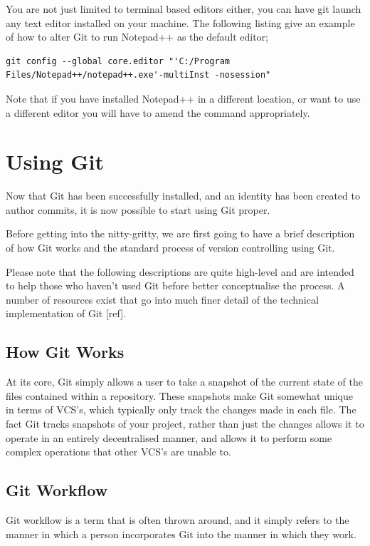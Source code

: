 \documentclass[11pt, a4paper, titlepage]{article}
\begin{document}
You are not just limited to terminal based editors either, you can have git
launch any text editor installed on your machine.
The following listing give an example of how to alter Git to run  Notepad++ as
the default editor;

\begin{lstlisting}[label=lst_config_note,
caption=Updating the defualt Git editor to Notepad++]
 git config --global core.editor "'C:/Program Files/Notepad++/notepad++.exe'-multiInst -nosession" 
\end{lstlisting}

Note that if you have installed Notepad++ in a different location, or want to
use a different editor you will have to amend the command appropriately.



\section{Using Git}
Now that Git has been successfully installed, and an identity has been created
to author commits, it is now possible to start using Git proper.

Before getting into the nitty-gritty, we are first going to have a brief
description of how Git works and the standard process of version controlling
using Git. 

Please note that the following descriptions are quite high-level and are
intended to help those who haven't used Git before better conceptualise the
process. 
A number of resources exist that go into much finer detail of the
technical implementation of Git [ref].

\subsection{How Git Works}
At its core, Git simply allows a user to take a snapshot of the current state
of the files contained within a repository.
These snapshots make Git somewhat unique in terms of VCS's, which typically
only track the changes made in each file.
The fact Git tracks snapshots of your project, rather than just the changes
allows it to operate in an entirely decentralised manner, and allows it to
perform some complex operations that other VCS's are unable to.


\subsection{Git Workflow}
Git workflow is a term that is often thrown around, and it simply refers to the
manner in which a person incorporates Git into the manner in which they work.
\end{document}
